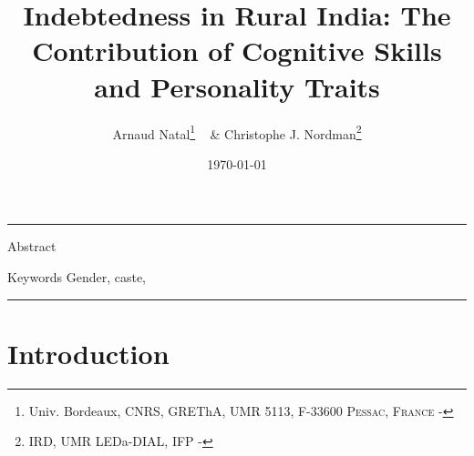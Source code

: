 \documentclass[a4paper, 11pt, onecolumn]{article}
\title{Indebtedness in Rural India: The Contribution of Cognitive Skills and Personality Traits}
\author{Arnaud Natal\thanks{Univ. Bordeaux, CNRS, GREThA, UMR 5113, F-33600 \textsc{Pessac, France} - \email{arnaud.natal@u-bordeaux.fr}} ~ \& Christophe J. Nordman\thanks{IRD, UMR LEDa-DIAL, IFP - \email{nordman@dial.prd}} }
\date{\today}
\begin{document}
\maketitle

\hrule 
\vspace{0.3cm}

\begin{resab}{Abstract}

\end{resab}

\begin{motkey}{Keywords}
Gender, caste, 
\end{motkey}


\hrule

\section{Introduction}
\label{Introduction}

\end{document}
